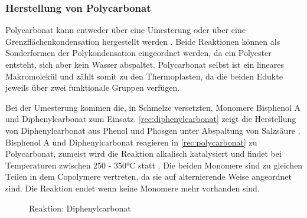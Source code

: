 \subsubsection{Herstellung von Polycarbonat}

Polycarbonat kann entweder über eine Umesterung oder über eine
Grenzflächenkondensation hergestellt werden \cite{cuzpe}. Beide Reaktionen
können als Sonderformen der Polykondensation eingeordnet werden, da ein
Polyester entsteht, sich aber kein Wasser abspaltet. Polycarbonat selbst ist ein
lineares Makromolekül und zählt somit zu den Thermoplasten, da die beiden Edukte
jeweils über zwei funktionale Gruppen verfügen.

Bei der Umesterung kommen die, in Schmelze versetzten, Monomere Bisphenol A und
Diphenylcarbonat zum Einsatz. \autoref{rec:diphenylcarbonat} zeigt die
Herstellung von Diphenylcarbonat aus Phenol und Phosgen unter Abspaltung von
Salzsäure \cite{cuzpe}. Bisphenol A und Diphenylcarbonat reagieren in
\autoref{rec:polycarbonat} zu Polycarbonat, zumeist wird die Reaktion alkalisch
katalysiert und findet bei Temperaturen zwischen 250 - 350°C statt \cite{pop}.
Die beiden Monomere sind zu gleichen Teilen in dem Copolymere vertreten, da sie
auf alternierende Weise angeordnet sind. Die Reaktion endet wenn keine Monomere
mehr vorhanden sind.

\begin{figure}[h]
    \begin{center}
        \footnotesize
        \setatomsep{1.7em}

        \chemsign{+}
        \chemrel{->}
        \chemsign{+}

        \caption{Reaktion: Diphenylcarbonat}
        \label{rec:diphenylcarbonat}
    \end{center}
\end{figure}

